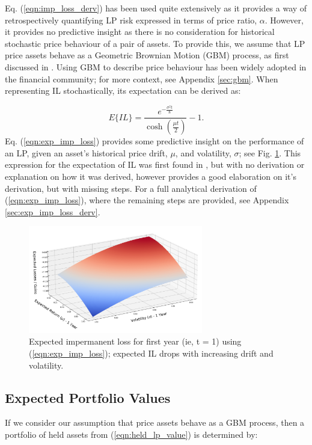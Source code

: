 \documentclass[journal,twocolumn,12pt]{ieeesyscoin}
\begin{document}
Eq. (\ref{eqn:imp_loss_derv}) has been used quite extensively \cite{Pin19a,Pin19b,Aig21,Pet21} as it provides a way of retrospectively quantifying LP risk expressed in terms of price ratio, $\alpha$. However, it provides no predictive insight as there is no consideration for historical stochastic price behaviour of a pair of assets. To provide this, we assume that LP price assets behave as a Geometric Brownian Motion (GBM) process, as first discussed in \cite{Gui21}. Using GBM to describe price behaviour has been widely adopted in the financial community; for more context, see Appendix \ref{sec:gbm}. When representing IL stochastically, its expectation can be derived as:

\begin{equation}\label{eqn:exp_imp_loss}
  E\{IL\} = \frac{e^{-\frac{\sigma^2 t}{8}}}{\cosh (\frac{\mu t}{2})} - 1.
\end{equation}
Eq. (\ref{eqn:exp_imp_loss}) provides some predictive insight on the performance of an LP, given an asset's historical price drift, $\mu$, and volatility, $\sigma$; see Fig. \ref{fig:exp_imp_loss}. This expression for the expectation of IL was first found in \cite{Gui21}, but with no derivation or explanation on how it was derived, however \cite{Dan22} provides a good elaboration on it's derivation, but with missing steps. For a full analytical derivation of (\ref{eqn:exp_imp_loss}), where the remaining steps are provided, see Appendix \ref{sec:exp_imp_loss_derv}.

\begin{figure}[h!]
\includegraphics[width=3in]{img/imp_loss.png}
\caption{Expected impermanent loss for first year (ie, t = 1) using (\ref{eqn:exp_imp_loss}); expected IL drops with increasing drift and volatility.} 
\label{fig:exp_imp_loss}
\end{figure}

\subsection{Expected Portfolio Values}
\label{sec:exp_portfolio_value}
If we consider our assumption that price assets behave as a GBM process, then a portfolio of held assets from (\ref{eqn:held_lp_value}) is determined by:
\end{document}

